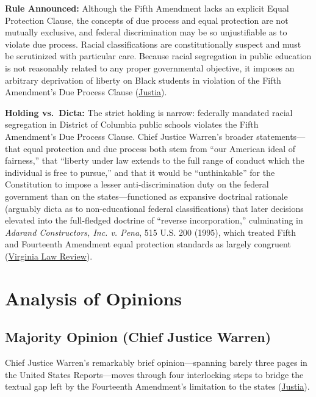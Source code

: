 \documentclass[12pt]{article}
\begin{document}
\textbf{Rule Announced:} Although the Fifth Amendment lacks an explicit Equal Protection Clause, the concepts of due process and equal protection are not mutually exclusive, and federal discrimination may be so unjustifiable as to violate due process. Racial classifications are constitutionally suspect and must be scrutinized with particular care. Because racial segregation in public education is not reasonably related to any proper governmental objective, it imposes an arbitrary deprivation of liberty on Black students in violation of the Fifth Amendment's Due Process Clause (\href{https://supreme.justia.com/cases/federal/us/347/497/}{Justia}).

\textbf{Holding vs.\ Dicta:} The strict holding is narrow: federally mandated racial segregation in District of Columbia public schools violates the Fifth Amendment's Due Process Clause. Chief Justice Warren's broader statements---that equal protection and due process both stem from ``our American ideal of fairness,'' that ``liberty under law extends to the full range of conduct which the individual is free to pursue,'' and that it would be ``unthinkable'' for the Constitution to impose a lesser anti-discrimination duty on the federal government than on the states---functioned as expansive doctrinal rationale (arguably dicta as to non-educational federal classifications) that later decisions elevated into the full-fledged doctrine of ``reverse incorporation,'' culminating in \textit{Adarand Constructors, Inc. v. Pena}, 515 U.S. 200 (1995), which treated Fifth and Fourteenth Amendment equal protection standards as largely congruent (\href{https://virginialawreview.org/wp-content/uploads/2020/12/1879.pdf}{Virginia Law Review}).

\section{Analysis of Opinions}

\subsection{Majority Opinion (Chief Justice Warren)}

Chief Justice Warren's remarkably brief opinion---spanning barely three pages in the United States Reports---moves through four interlocking steps to bridge the textual gap left by the Fourteenth Amendment's limitation to the states (\href{https://supreme.justia.com/cases/federal/us/347/497/}{Justia}).
\end{document}
